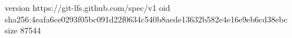 version https://git-lfs.github.com/spec/v1
oid sha256:4eafa6ce0293f05bc091d22f0634c540b8aede13632b582e4e16e9eb6cd38ebc
size 87544
